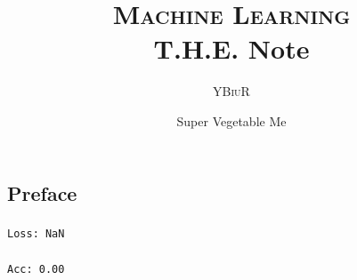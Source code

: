 \documentclass[oneside]{book}
\title{\textsc{Machine Learning}\\T.H.E. Note}
\author{\textsc{YBiuR}}
\date{Super Vegetable Me}
\theoremstyle{definition}
\theoremstyle{remark}
\begin{document}
\begin{spacing}{1.2}
\setlength{\parskip}{1em}
\setlength{\parindent}{0em}

\frontmatter
\maketitle
\chapter*{Preface}
\paragraph{}\verb|Loss: NaN|
\paragraph{}\verb|Acc: 0.00|
\mainmatter








\end{spacing}
\end{document}

